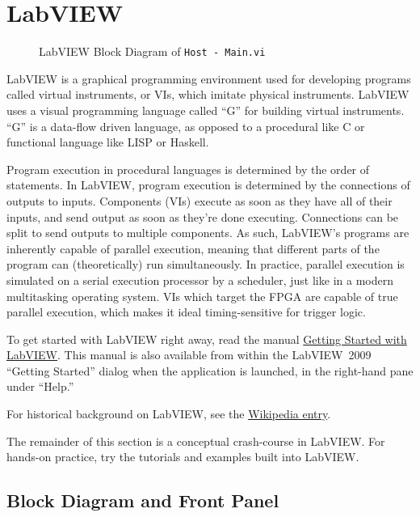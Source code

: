 
\section{LabVIEW}
\label{sec:eq_labview}

\begin{figure}[htbp]
  \centering
  \caption{LabVIEW Block Diagram of \texttt{Host - Main.vi}}
  \label{fig:eq_labview:hostmainvi}
\end{figure}

LabVIEW is a graphical programming environment used for developing programs called virtual instruments, or \glspl{VI}, which imitate physical instruments.  LabVIEW uses a visual programming language called ``G'' for building virtual instruments.  ``G'' is a data-flow driven language, as opposed to a procedural like C or functional language like LISP or Haskell.

Program execution in procedural languages is determined by the order of statements.  In LabVIEW, program execution is determined by the connections of outputs to inputs.  Components (VIs) execute as soon as they have all of their inputs, and send output as soon as they're done executing.  Connections can be split to send outputs to multiple components.  As such, LabVIEW's programs are inherently capable of parallel execution, meaning that different parts of the program can (theoretically) run simultaneously.  In practice, parallel execution is simulated on a serial execution processor by a scheduler, just like in a modern multitasking operating system.  VIs which target the FPGA are capable of true parallel execution, which makes it ideal timing-sensitive for trigger logic.

To get started with LabVIEW right away, read the manual \href{Manuals/LV_Getting_Started}{Getting Started with LabVIEW}.  This manual is also available from within the LabVIEW~2009 ``Getting Started'' dialog when the application is launched, in the right-hand pane under ``Help.''

For historical background on LabVIEW, see the \href{http://en.wikipedia.org/wiki/LabVIEW}{Wikipedia entry}.

The remainder of this section is a conceptual crash-course in LabVIEW.  For hands-on practice, try the tutorials and examples built into LabVIEW.

\subsection{Block Diagram and Front Panel}
\label{sec:eq_labview:block_diagram}

